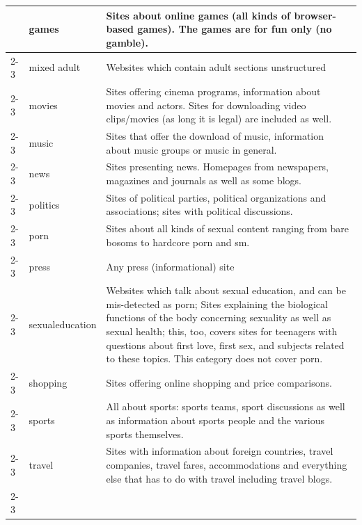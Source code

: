 \begin{longtable}{p{}|p{}|p{}}
                                                         & games & Sites about online games (all kinds of browser-based games). The games are for fun only (no gamble).\\ \cline{2-3}
                                                         & mixed adult & Websites which contain adult sections unstructured\\ \cline{2-3}
                                                         & movies & Sites offering cinema programs, information about movies and actors. Sites for downloading video clips/movies (as long it is legal) are included as well.\\ \cline{2-3}
                                                         & music & Sites that offer the download of music, information about music groups or music in general.\\ \cline{2-3}
                                                         & news & Sites presenting news. Homepages from newspapers, magazines and journals as well as some blogs.\\ \cline{2-3}
                                                         & politics & Sites of political parties, political organizations and associations; sites with political discussions.\\ \cline{2-3}
                                                         & porn & Sites about all kinds of sexual content ranging from bare bosoms to hardcore porn and sm.\\ \cline{2-3}
                                                         & press & Any press (informational) site \\ \cline{2-3}
                                                         & sexualeducation & Websites which talk about sexual education, and can be mis-detected as porn; Sites explaining the biological functions of the body concerning sexuality as well as sexual health; this, too, covers sites for teenagers with questions about first love, first sex, and subjects related to these topics. This category does not cover porn. \\ \cline{2-3}
                                                         & shopping & Sites offering online shopping and price comparisons. \\ \cline{2-3}
                                                         & sports & All about sports: sports teams, sport discussions as well as information about sports people and the various sports themselves.\\ \cline{2-3}
                                                         & travel & Sites with information about foreign countries, travel companies, travel fares, accommodations and everything else that has to do with travel including travel blogs.\\ \cline{2-3}

\end{longtable}
